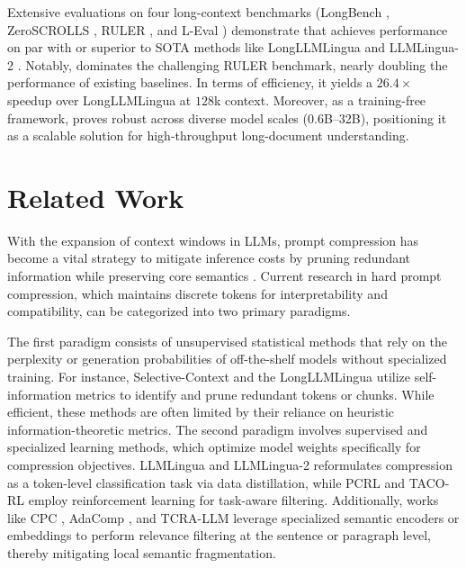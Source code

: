 \documentclass[11pt]{article}
\newcommand{\ours}{\text{BEAVER}\xspace}
\begin{document}
Extensive evaluations on four long-context benchmarks (LongBench \cite{bai2024longbench}, ZeroSCROLLS \cite{shaham2023zeroscrolls}, RULER \cite{hsieh2024ruler}, and L-Eval \cite{an2024eval}) demonstrate that \ours achieves performance on par with or superior to SOTA methods like LongLLMLingua \cite{jiang2024longllmlingua} and LLMLingua-2 \cite{pan2024llmlingua2}. Notably, \ours dominates the challenging RULER benchmark, nearly doubling the performance of existing baselines. In terms of efficiency, it yields a $26.4\times$ speedup over LongLLMLingua at $128$k context. Moreover, as a training-free framework, \ours proves robust across diverse model scales (0.6B--32B), positioning it as a scalable solution for high-throughput long-document understanding.

\section{Related Work}

With the expansion of context windows in LLMs, prompt compression has become a vital strategy to mitigate inference costs by pruning redundant information while preserving core semantics \cite{li2025prompt}. Current research in hard prompt compression, which maintains discrete tokens for interpretability and compatibility, can be categorized into two primary paradigms.

The first paradigm consists of unsupervised statistical methods that rely on the perplexity or generation probabilities of off-the-shelf models without specialized training. For instance, Selective-Context \cite{li2023compressing} and the LongLLMLingua \cite{jiang2024longllmlingua} utilize self-information metrics to identify and prune redundant tokens or chunks. While efficient, these methods are often limited by their reliance on heuristic information-theoretic metrics. The second paradigm involves supervised and specialized learning methods, which optimize model weights specifically for compression objectives. LLMLingua and LLMLingua-2 \cite{jiang2023llmlingua, pan2024llmlingua2} reformulates compression as a token-level classification task via data distillation, while PCRL \cite{jung2024discrete} and TACO-RL \cite{shandilya2025taco} employ reinforcement learning for task-aware filtering. Additionally, works like CPC \cite{liskavets2025prompt}, AdaComp \cite{zhang2024adacomp}, and TCRA-LLM \cite{liu2023tcra} leverage specialized semantic encoders or embeddings to perform relevance filtering at the sentence or paragraph level, thereby mitigating local semantic fragmentation.
\end{document}
